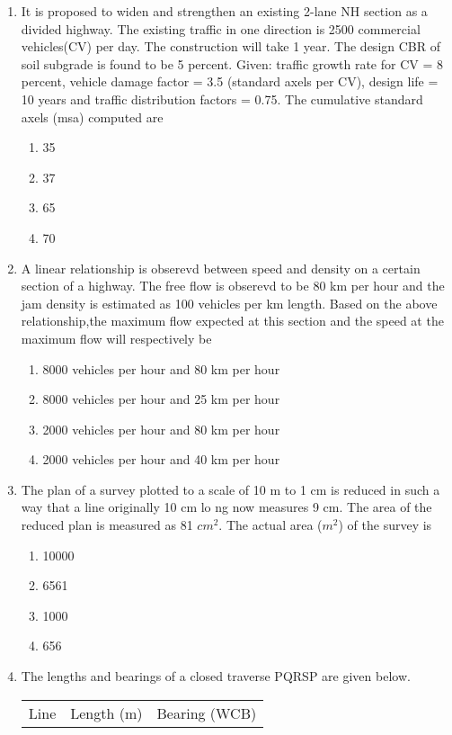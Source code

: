 \documentclass[journal]{IEEEtran}
\begin{document}
\begin{enumerate}
\begin{multicols}{2}
\begin{enumerate}
		\item decrease for both the roads
		\item remain unchanged for both the roads
	\end{enumerate}
\end{multicols}
	\item It is proposed to widen and strengthen an existing 2-lane NH section as a divided highway. The existing traffic in one direction is 2500 commercial vehicles(CV) per day. The construction will take 1 year. The design CBR of soil subgrade is found to be 5 percent. Given: traffic growth rate for CV = 8 percent, vehicle damage factor = 3.5 (standard axels per CV), design life = 10 years and traffic distribution factors = 0.75. The cumulative standard axels (msa) computed are
\begin{multicols}{2}
	\begin{enumerate}
		\item 35
		\item 37
		\item 65
		\item 70
	\end{enumerate}
\end{multicols}	
	\item A linear relationship is obserevd between speed and density on a certain section of a highway. The free flow is obserevd to be 80 km per hour and the jam density is estimated as 100 vehicles per km length. Based on the above relationship,the maximum flow expected at this section and the speed at the maximum flow will respectively be
\begin{multicols}{2}
	\begin{enumerate}
		\item 8000 vehicles per hour and 80 km per hour
		\item 8000 vehicles per hour and 25 km per hour
		\item 2000 vehicles per hour and 80 km per hour
		\item 2000 vehicles per hour and 40 km per hour
	\end{enumerate}
\end{multicols}	
	\item The plan of a survey plotted to a scale of 10 m to 1 cm is reduced in such a way that a line originally 10 cm lo
		ng now measures 9 cm. The area of the reduced plan is measured as 81 $cm^2$. The actual area ($m^2$) of the survey is
\begin{multicols}{2}
	\begin{enumerate}
		\item 10000
		\item 6561
		\item 1000
		\item 656
	\end{enumerate}
\end{multicols}	
	\item The lengths and bearings of a closed traverse PQRSP are given below.
\begin{tabular}{|l|l|l|}
	\hline
	 Line & Length (m)   &  Bearing (WCB)  \\


\end{tabular}
\end{enumerate}
\end{document}
